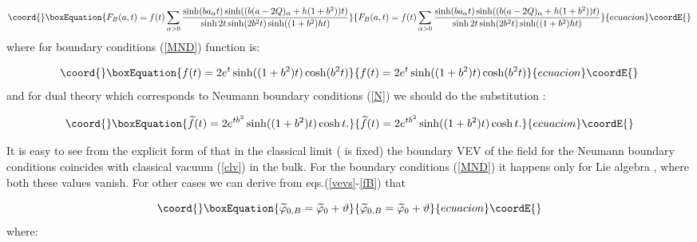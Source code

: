 \documentclass[a4paper,12pt]{article}
\begin{document}
\begin{equation}\coord{}\boxEquation{
F_B(a,t)=f(t)\sum_{\alpha >0}\frac{\sinh (ba_\alpha t)\sinh ((b(a-2Q)_\alpha
+h(1+b^2))t)}{\sinh 2t\sinh (2b^2t)\sinh ((1+b^2)ht)}  \label{fbs}
}{
F_B(a,t)=f(t)\sum_{\alpha >0}\frac{\sinh (ba_\alpha t)\sinh ((b(a-2Q)_\alpha
+h(1+b^2))t)}{\sinh 2t\sinh (2b^2t)\sinh ((1+b^2)ht)}  }{ecuacion}\coordE{}\end{equation}
where for boundary conditions (\ref{MND}) function \coordHE{} is:

\begin{equation}\coord{}\boxEquation{
f(t)=2e^t\sinh ((1+b^2)t)\cosh (b^2t)  \label{fB}
}{
f(t)=2e^t\sinh ((1+b^2)t)\cosh (b^2t)  }{ecuacion}\coordE{}\end{equation}
and for dual theory which corresponds to Neumann boundary conditions (\ref{N})
we should do the substitution \coordHE{}:

\begin{equation}\coord{}\boxEquation{
\widetilde{f}(t)=2e^{tb^2}\sinh ((1+b^2)t)\cosh t.  \label{fN}
}{
\widetilde{f}(t)=2e^{tb^2}\sinh ((1+b^2)t)\cosh t.  }{ecuacion}\coordE{}\end{equation}

It is easy to see from the explicit form of \coordHE{} that in the classical
limit (\coordHE{} is fixed) the boundary VEV 
\coordHE{} of the field \coordHE{} for the Neumann boundary
conditions coincides with 
classical vacuum \coordHE{} (\ref{clv}) in the bulk. 
For the boundary conditions
(\ref{MND}) it happens only for Lie algebra \coordHE{}, where both these values
vanish. For other cases we can derive from eqs.(\ref{vevs}-\ref{fB}) that

\begin{equation}\coord{}\boxEquation{
\widetilde{\varphi }_{0,B}=\widetilde{\varphi }_0+\vartheta  \label{TET}
}{
\widetilde{\varphi }_{0,B}=\widetilde{\varphi }_0+\vartheta  }{ecuacion}\coordE{}\end{equation}
where:
\end{document}
